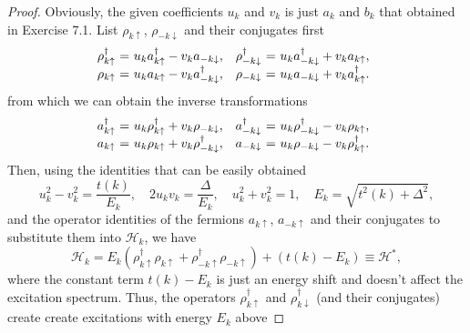 \begin{solution}\leavevmode
  \begin{enumext}
    \item \begin{proof}
      Obviously, the given coefficients $u_k$ and $v_k$ is just $a_k$ and $b_k$
      that obtained in Exercise 7.1.
      List $\rho_{k\uparrow}$, $\rho_{-k\downarrow}$ and their conjugates first
      \[
        \begin{array}{l@{~}c@{~}l@{\quad} l@{~}c@{~}l@{\quad}}
          \rho_{k\uparrow}^\dagger & = &
          u_k a_{k\uparrow}^\dagger - v_k a_{-k\downarrow}, &
          \rho_{-k\downarrow}^\dagger & = &
          u_k a_{-k\downarrow}^\dagger + v_k a_{k\uparrow},\\
          \rho_{k\uparrow} & = &
          u_k a_{k\uparrow} - v_k a_{-k\downarrow}^\dagger, &
          \rho_{-k\downarrow} & = &
          u_k a_{-k\downarrow} + v_k a_{k\uparrow}^\dagger.
        \end{array}
      \]
      from which we can obtain the inverse transformations
      \[
        \begin{array}{l@{~}c@{~}l@{\quad} l@{~}c@{~}l@{\quad}}
          a_{k\uparrow}^\dagger & = &
          u_k \rho_{k\uparrow}^\dagger    + v_k \rho_{-k\downarrow}, &
          a_{-k\downarrow}^\dagger & = &
          u_k \rho_{-k\downarrow}^\dagger - v_k \rho_{k\uparrow},\\
          a_{k\uparrow} & = &
          u_k \rho_{k\uparrow}            + v_k \rho_{-k\downarrow}^\dagger, &
          a_{-k\downarrow} & = &
          u_k \rho_{-k\downarrow}         - v_k \rho_{k\uparrow}^\dagger.
        \end{array}
      \]
      Then, using the identities that can be easily obtained
      \[
        u_k^2 - v_k^2 = \frac{t(k)}{E_k}, \quad
        2u_kv_k = \frac{\Delta}{E_k}, \quad
        u_k^2 + v_k^2 = 1, \quad
        E_k = \sqrt{t^2(k) + \Delta^2},
      \]
      and the operator identities of the fermions $a_{k\uparrow}$,
      $a_{-k\uparrow}$ and their conjugates to substitute them into
      $\mathcal H_k$, we have
      \[
        \mathcal H_k
      = E_k(\rho_{k\uparrow}^\dagger  \rho_{k\uparrow} +
            \rho_{-k\uparrow}^\dagger \rho_{-k\uparrow}) +
        (t(k) - E_k) \equiv \mathcal H^*,
      \]
      where the constant term $t(k) - E_k$ is just an energy shift and doesn't
      affect the excitation spectrum. Thus, the operators
      $\rho_{k\uparrow}^\dagger$ and $\rho_{k\downarrow}^\dagger$
      (and their conjugates) create create excitations with energy $E_k$ above

\end{proof}
\end{enumext}
\end{solution}
